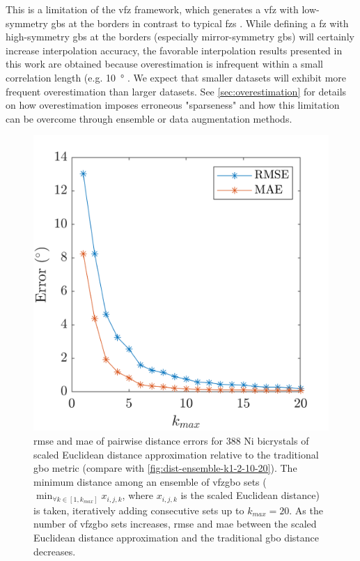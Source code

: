 \documentclass[final,twocolumn,12pt]{elsarticle}
\begin{document}
This is a limitation of the \gls{vfz} framework, which generates a \gls{vfz} with low-symmetry \glspl{gb} at the borders in contrast to typical \glspl{fz} \cite{patalaSymmetriesRepresentationGrain2013,homerGrainBoundaryPlane2015}. While defining a \gls{fz} with high-symmetry \glspl{gb} at the borders (especially mirror-symmetry \glspl{gb}) will certainly increase interpolation accuracy, the favorable interpolation results presented in this work are obtained because overestimation is infrequent within a small correlation length (e.g. \SI{10}{\degree} \cite{olmstedSurveyComputedGrain2009}. %
We expect that smaller datasets will exhibit more frequent overestimation than larger datasets.
See \cref{sec:overestimation} for details on how overestimation imposes erroneous "sparseness" and how this limitation can be overcome through ensemble or data augmentation methods.

\begin{figure}[ht]
    \centering
    \includegraphics[scale=1]{figures/dist-ensemble-rmse-mae.png}
    \caption{\Gls{rmse} and \gls{mae} of pairwise distance errors for 388 Ni bicrystals \cite{olmstedSurveyComputedGrain2009} of scaled Euclidean distance approximation relative to the traditional \gls{gbo} metric \cite{chesserLearningGrainBoundary2020} (compare with \cref{fig:dist-ensemble-k1-2-10-20}). The minimum distance among an ensemble of \gls{vfzgbo} sets ($\min_{\forall k \in [1,k_{max}]}x_{i,j,k}$, where $x_{i,j,k}$ is the scaled Euclidean distance) is taken, iteratively adding consecutive sets up to $k_{max} = 20$. As the number of \gls{vfzgbo} sets increases, \gls{rmse} and \gls{mae} between the scaled Euclidean distance approximation and the traditional \gls{gbo} distance decreases.}
    \label{fig:dist-ensemble-rmse-mae}
\end{figure}
\end{document}

